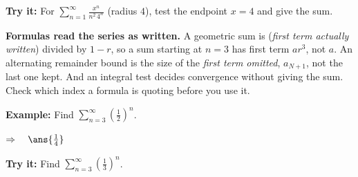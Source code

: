 \documentclass[12pt]{article}
\begin{document}
\begin{tryitbox}
\textbf{Try it:} \quad For $\displaystyle\sum_{n=1}^{\infty}\frac{x^{n}}{n^{2}\,4^{n}}$ (radius $4$), test the endpoint $x = 4$ and give the sum.\\[2pt]
\end{tryitbox}


\begin{formulabox}
\textbf{Formulas read the series as written.} A geometric sum is (\emph{first term actually written}) divided by $1-r$, so a sum starting at $n=3$ has first term $ar^{3}$, not $a$. An alternating remainder bound is the size of the \emph{first term omitted}, $a_{N+1}$, not the last one kept. And an integral test decides convergence without giving the sum. Check which index a formula is quoting before you use it.
\end{formulabox}

\begin{examplebox}
\textbf{Example:} \quad Find $\displaystyle\sum_{n=3}^{\infty}\left(\frac{1}{2}\right)^{n}$.

$\Rightarrow\quad \ans{\frac{1}{4}}$
\end{examplebox}

\begin{tryitbox}
\textbf{Try it:} \quad Find $\displaystyle\sum_{n=3}^{\infty}\left(\frac{1}{3}\right)^{n}$.\\[2pt]
\end{tryitbox}
\end{document}
